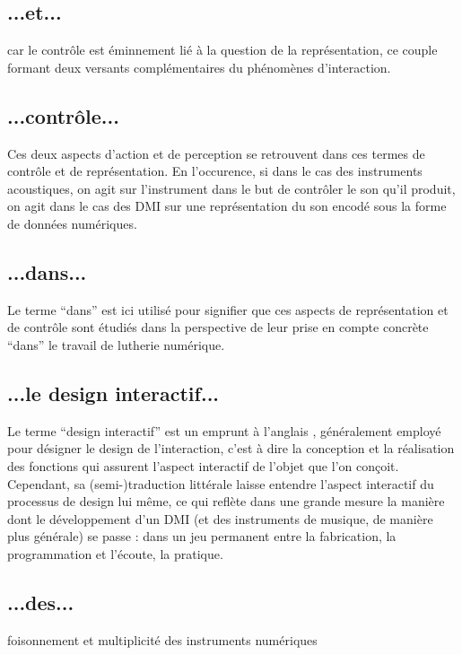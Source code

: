 \subsection*{...et...}
car le contrôle est éminnement lié à la question de la représentation, ce couple formant deux versants complémentaires du phénomènes d'interaction.

\subsection*{...contrôle...}

Ces deux aspects d'action et de perception se retrouvent dans ces termes de contrôle et de représentation. En l'occurence, si dans le cas des instruments acoustiques, on agit sur l'instrument dans le but de contrôler le son qu'il produit, on agit dans le cas des \gls{DMI} sur une représentation du son encodé sous la forme de données numériques.

\subsection*{...dans...}
Le terme ``dans'' est ici utilisé pour signifier que ces aspects de représentation et de contrôle sont étudiés dans la perspective de leur prise en compte concrète ``dans'' le travail de lutherie numérique.

\subsection*{...le design interactif...}
Le terme ``design interactif'' est un emprunt à l'anglais , généralement employé pour désigner le design de l'interaction, c'est à dire la conception et la réalisation des fonctions qui assurent l'aspect interactif de l'objet que l'on conçoit. Cependant, sa (semi-)traduction littérale laisse entendre l'aspect interactif du processus de design lui même, ce qui reflète dans une grande mesure la manière dont le développement d'un \gls{DMI} (et des instruments de musique, de manière plus générale) se passe : dans un jeu permanent entre la fabrication, la programmation et l'écoute, la pratique.

\subsection*{...des...}
foisonnement et multiplicité des instruments numériques

